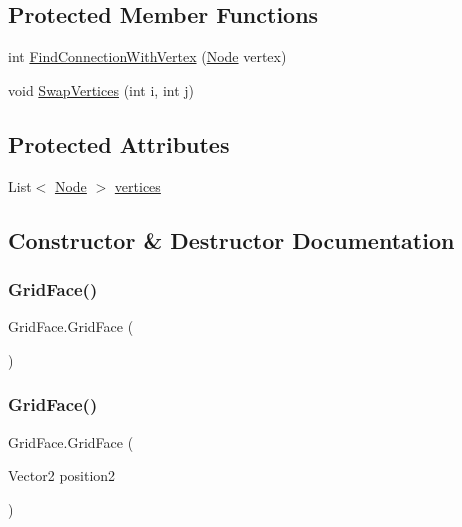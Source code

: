 \subsection*{Protected Member Functions}
\begin{DoxyCompactItemize}
\item 
int \mbox{\hyperlink{class_grid_face_a4a97d1968f8e31252c109c6a817d4db5}{Find\+Connection\+With\+Vertex}} (\mbox{\hyperlink{class_node}{Node}} vertex)
\item 
void \mbox{\hyperlink{class_grid_face_a7a09019689547ed0d1e719f999e9a50b}{Swap\+Vertices}} (int i, int j)
\end{DoxyCompactItemize}
\subsection*{Protected Attributes}
\begin{DoxyCompactItemize}
\item 
List$<$ \mbox{\hyperlink{class_node}{Node}} $>$ \mbox{\hyperlink{class_grid_face_ad283473ab08b56840f9ae843e60c1d15}{vertices}}
\end{DoxyCompactItemize}


\subsection{Constructor \& Destructor Documentation}
\mbox{\label{class_grid_face_a328917a6e83b3357fbb95aae6c43b861}} 
\subsubsection{\texorpdfstring{Grid\+Face()}{GridFace()}\hspace{0.1cm}{\footnotesize\ttfamily [1/3]}}
{\footnotesize\ttfamily Grid\+Face.\+Grid\+Face (\begin{DoxyParamCaption}{ }\end{DoxyParamCaption})}

\mbox{\label{class_grid_face_a2f31cf59941dd0886b1a9a3bd3eec590}} 
\subsubsection{\texorpdfstring{Grid\+Face()}{GridFace()}\hspace{0.1cm}{\footnotesize\ttfamily [2/3]}}
{\footnotesize\ttfamily Grid\+Face.\+Grid\+Face (\begin{DoxyParamCaption}\item[{Vector2}]{position2 }\end{DoxyParamCaption})}

